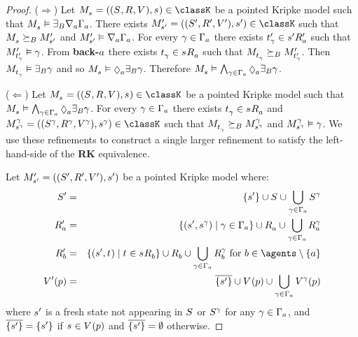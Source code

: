 \begin{proof}
($\Rightarrow$) Let $\kPModelAndTuple{\kStateS} \in \classK$ be a pointed Kripke model such that $\kPModel{\kStateS} \entails \somerefsBs \coversA \Gamma_\agentA$.
There exists $\kPModelAndTupleP{\kStateSP} \in \classK$ such that $\kPModel{\kStateS} \simulatesBs \kPModelP{\kStateSP}$ and $\kPModelP{\kStateSP} \entails \coversA \Gamma_\agentA$.
For every $\gamma \in \Gamma_\agentA$ there exists $\kStateTP_\gamma \in \kSuccessorsPA{\kStateSP}$ such that $\kPModelP{\kStateTP_\gamma} \entails \gamma$.
From {\bf back-$\agentA$} there exists $\kStateT_\gamma \in \kSuccessorsA{\kStateS}$ such that $\kPModel{\kStateT_\gamma} \simulatesBs \kPModelP{\kStateTP_\gamma}$.
Then $\kPModel{\kStateT_\gamma} \entails \somerefsBs \gamma$ and so $\kPModel{\kStateS} \entails \possibleA \somerefsBs \gamma$.
Therefore $\kPModel{\kStateS} \entails \bigwedge_{\gamma \in \Gamma_\agentA} \possibleA \somerefsBs \gamma$.

($\Leftarrow$) Let $\kPModelAndTuple{\kStateS} \in \classK$ be a pointed Kripke model such that $\kPModel{\kStateS} \entails \bigwedge_{\gamma \in \Gamma_\agentA} \possibleA \somerefsBs \gamma$.
For every $\gamma \in \Gamma_\agentA$ there exists $\kStateT_\gamma \in \kSuccessorsA{\kStateS}$ and $\kPModelAndTuple[\gamma]{\kStateS[\gamma]} \in \classK$ such that $\kPModel{\kStateT_\gamma} \simulatesBs \kPModel[\gamma]{\kStateS[\gamma]}$ and $\kPModel[\gamma]{\kStateS[\gamma]} \entails \gamma$.
We use these refinements to construct a single larger refinement to satisfy the left-hand-side of the {\bf RK} equivalence.

Let $\kPModelAndTupleP{\kStateSP}$ be a pointed Kripke model where:
\begin{eqnarray*}
    \kStatesP &=& \{\kStateSP\} \cup \kStates \cup \bigcup_{\gamma \in \Gamma_\agentA} \kStates[\gamma]\\
    \kAccessibilityPA &=& \{(\kStateSP, \kStateS[\gamma]) \mid \gamma \in \Gamma_\agentA\} \cup \kAccessibilityA \cup \bigcup_{\gamma \in \Gamma_\agentA} \kAccessibilityA[\gamma]\\
    \kAccessibilityPB &=& \{(\kStateSP, \kStateT) \mid \kStateT \in \kSuccessorsB{\kStateS}\} \cup \kAccessibilityB \cup \bigcup_{\gamma \in \Gamma_\agentA} \kAccessibilityB[\gamma] \text{ for } \agentB \in \agents \setminus \{\agentA\}\\
    \kValuationP(\atomP) &=& \overline{\{\kStateSP\}} \cup \kValuation(\atomP) \cup \bigcup_{\gamma \in \Gamma_\agentA} \kValuation[\gamma](\atomP)
\end{eqnarray*}
where $\kStateSP$ is a fresh state not appearing in $\kStates$ or $\kStates[\gamma]$ for any $\gamma \in \Gamma_\agentA$, and $\overline{\{\kStateSP\}} = \{\kStateSP\}$ if $\kStateS \in \kValuation(\atomP)$ and $\overline{\{\kStateSP\}} = \emptyset$ otherwise.


\end{proof}
